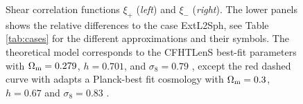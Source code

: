 \documentclass[fleqn,usenatbib]{mnras} %
\begin{document}
\begin{figure}
\begin{center}
  \end{center}

  \caption{Shear correlation functions $\xi_+$ (\emph{left}) and $\xi_-$ (\emph{right}).
    The lower panels shows the relative differences to the case ExtL2Sph,  see Table \ref{tab:cases} for the different
    approximations and their symbols.
    The theoretical model corresponds to the CFHTLenS best-fit parameters with
    $\Omega_{\rm m} = 0.279$, $h=0.701$, and $\sigma_8 = 0.79$ \citep{CFHTLenS-2pt-notomo},
    except the red dashed curve with adapts a Planck-best fit
    cosmology with $\Omega_{\rm m} = 0.3$, $h=0.67$ and $\sigma_8 = 0.83$ \citep{2015arXiv150201589P}.
  }

  \label{fig:xi_pm}

\end{figure}
\end{document}
